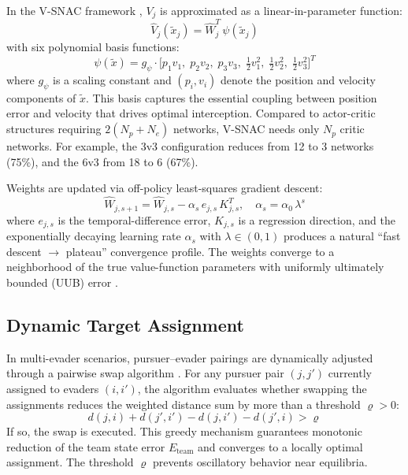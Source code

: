 \documentclass[conference]{IEEEtran}
\begin{document}
In the V-SNAC framework \cite{b_xu2024}, $V_j$ is approximated as a linear-in-parameter function:
\begin{equation}\label{eq:vsnac}
\hat{V}_j(\tilde{x}_j) = \hat{W}_j^T\,\psi(\tilde{x}_j)
\end{equation}
with six polynomial basis functions:
\begin{equation}\label{eq:basis}
\psi(\tilde{x}) = g_\psi\!\cdot\!\big[p_1 v_1,\; p_2 v_2,\; p_3 v_3,\; \tfrac{1}{2}v_1^2,\; \tfrac{1}{2}v_2^2,\; \tfrac{1}{2}v_3^2\big]^T
\end{equation}
where $g_\psi$ is a scaling constant and $(p_i, v_i)$ denote the position and velocity components of $\tilde{x}$. This basis captures the essential coupling between position error and velocity that drives optimal interception. Compared to actor-critic structures requiring $2(N_p + N_e)$ networks, V-SNAC needs only $N_p$ critic networks. For example, the 3v3 configuration reduces from 12 to 3 networks (75\%), and the 6v3 from 18 to 6 (67\%).

Weights are updated via off-policy least-squares gradient descent:
\begin{equation}\label{eq:weight_update}
\hat{W}_{j,s+1} = \hat{W}_{j,s} - \alpha_s\,e_{j,s}\,K_{j,s}^T, \quad \alpha_s = \alpha_0\,\lambda^s
\end{equation}
where $e_{j,s}$ is the temporal-difference error, $K_{j,s}$ is a regression direction, and the exponentially decaying learning rate $\alpha_s$ with $\lambda \in (0,1)$ produces a natural ``fast descent $\to$ plateau'' convergence profile. The weights converge to a neighborhood of the true value-function parameters with uniformly ultimately bounded (UUB) error \cite{b_lewis1998}.

\subsection{Dynamic Target Assignment}

In multi-evader scenarios, pursuer--evader pairings are dynamically adjusted through a pairwise swap algorithm \cite{b_graphswap,b_xu2024}. For any pursuer pair $(j, j')$ currently assigned to evaders $(i, i')$, the algorithm evaluates whether swapping the assignments reduces the weighted distance sum by more than a threshold $\varrho > 0$:
\begin{equation}\label{eq:swap}
d(j,i) + d(j',i') - d(j,i') - d(j',i) > \varrho
\end{equation}
If so, the swap is executed. This greedy mechanism guarantees monotonic reduction of the team state error $E_{\mathrm{team}}$ and converges to a locally optimal assignment. The threshold $\varrho$ prevents oscillatory behavior near equilibria.
\end{document}
